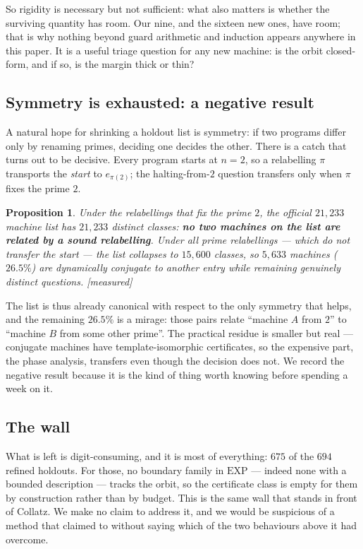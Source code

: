 \documentclass[11pt,a4paper]{article}
\theoremstyle{plain}
\newtheorem{proposition}[theorem]{Proposition}
\theoremstyle{definition}
\newcommand{\Meas}{\textcolor{linkc}{\textsf{[measured]}}}
\begin{document}
So rigidity is necessary but not sufficient: what also matters is whether
the surviving quantity has room. Our nine, and the sixteen new ones, have
room; that is why nothing beyond guard arithmetic and induction appears
anywhere in this paper. It is a useful triage question for any new
machine: is the orbit closed-form, and if so, is the margin thick or
thin?

\subsection{Symmetry is exhausted: a negative result}

A natural hope for shrinking a holdout list is symmetry: if two programs
differ only by renaming primes, deciding one decides the other. There is
a catch that turns out to be decisive. Every program starts at $n = 2$,
so a relabelling $\pi$ transports the \emph{start} to $e_{\pi(2)}$; the
halting-from-$2$ question transfers only when $\pi$ fixes the prime $2$.

\begin{proposition}\label{prop:symm}
Under the relabellings that fix the prime $2$, the official $21{,}233$
machine list has $21{,}233$ distinct classes: \textbf{no two machines on
the list are related by a sound relabelling}. Under all prime
relabellings --- which do \emph{not} transfer the start --- the list
collapses to $15{,}600$ classes, so $5{,}633$ machines ($26.5\%$) are
dynamically conjugate to another entry while remaining genuinely distinct
questions. \Meas
\end{proposition}

The list is thus already canonical with respect to the only symmetry that
helps, and the remaining $26.5\%$ is a mirage: those pairs relate
``machine $A$ from $2$'' to ``machine $B$ from some other prime''. The
practical residue is smaller but real --- conjugate machines have
template-isomorphic certificates, so the expensive part, the phase
analysis, transfers even though the decision does not. We record the
negative result because it is the kind of thing worth knowing before
spending a week on it.

\subsection{The wall}

What is left is digit-consuming, and it is most of everything:
$675$ of the $694$ refined holdouts. For those, no boundary family in
$\mathrm{EXP}$ --- indeed none with a bounded description --- tracks the
orbit, so the certificate class is empty for them by construction rather
than by budget. This is the same wall that stands in front of Collatz.
We make no claim to address it, and we would be suspicious of a method
that claimed to without saying which of the two behaviours above it had
overcome.
\end{document}
